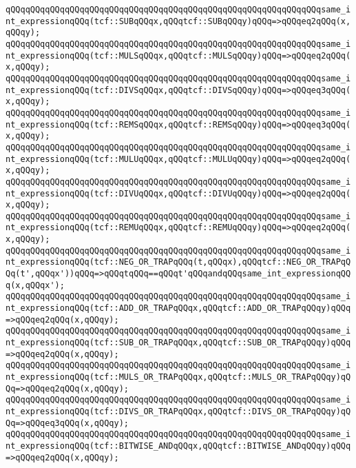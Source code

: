 \verb|qQQqqQQqqQQqqQQqqQQqqQQqqQQqqQQqqQQqqQQqqQQqqQQqqQQqqQQqqQQqqQQqsame_int_expressionqQQq(tcf::SUBqQQqx,qQQqtcf::SUBqQQqy)qQQq=>qQQqeq2qQQq(x,qQQqy);|\newline
\verb|qQQqqQQqqQQqqQQqqQQqqQQqqQQqqQQqqQQqqQQqqQQqqQQqqQQqqQQqqQQqqQQqsame_int_expressionqQQq(tcf::MULSqQQqx,qQQqtcf::MULSqQQqy)qQQq=>qQQqeq2qQQq(x,qQQqy);|\newline
\verb|qQQqqQQqqQQqqQQqqQQqqQQqqQQqqQQqqQQqqQQqqQQqqQQqqQQqqQQqqQQqqQQqsame_int_expressionqQQq(tcf::DIVSqQQqx,qQQqtcf::DIVSqQQqy)qQQq=>qQQqeq3qQQq(x,qQQqy);|\newline
\verb|qQQqqQQqqQQqqQQqqQQqqQQqqQQqqQQqqQQqqQQqqQQqqQQqqQQqqQQqqQQqqQQqsame_int_expressionqQQq(tcf::REMSqQQqx,qQQqtcf::REMSqQQqy)qQQq=>qQQqeq3qQQq(x,qQQqy);|\newline
\verb|qQQqqQQqqQQqqQQqqQQqqQQqqQQqqQQqqQQqqQQqqQQqqQQqqQQqqQQqqQQqqQQqsame_int_expressionqQQq(tcf::MULUqQQqx,qQQqtcf::MULUqQQqy)qQQq=>qQQqeq2qQQq(x,qQQqy);|\newline
\verb|qQQqqQQqqQQqqQQqqQQqqQQqqQQqqQQqqQQqqQQqqQQqqQQqqQQqqQQqqQQqqQQqsame_int_expressionqQQq(tcf::DIVUqQQqx,qQQqtcf::DIVUqQQqy)qQQq=>qQQqeq2qQQq(x,qQQqy);|\newline
\verb|qQQqqQQqqQQqqQQqqQQqqQQqqQQqqQQqqQQqqQQqqQQqqQQqqQQqqQQqqQQqqQQqsame_int_expressionqQQq(tcf::REMUqQQqx,qQQqtcf::REMUqQQqy)qQQq=>qQQqeq2qQQq(x,qQQqy);|\newline
\verb|qQQqqQQqqQQqqQQqqQQqqQQqqQQqqQQqqQQqqQQqqQQqqQQqqQQqqQQqqQQqqQQqsame_int_expressionqQQq(tcf::NEG_OR_TRAPqQQq(t,qQQqx),qQQqtcf::NEG_OR_TRAPqQQq(t',qQQqx'))qQQq=>qQQqtqQQq==qQQqt'qQQqandqQQqsame_int_expressionqQQq(x,qQQqx');|\newline
\verb|qQQqqQQqqQQqqQQqqQQqqQQqqQQqqQQqqQQqqQQqqQQqqQQqqQQqqQQqqQQqqQQqsame_int_expressionqQQq(tcf::ADD_OR_TRAPqQQqx,qQQqtcf::ADD_OR_TRAPqQQqy)qQQq=>qQQqeq2qQQq(x,qQQqy);|\newline
\verb|qQQqqQQqqQQqqQQqqQQqqQQqqQQqqQQqqQQqqQQqqQQqqQQqqQQqqQQqqQQqqQQqsame_int_expressionqQQq(tcf::SUB_OR_TRAPqQQqx,qQQqtcf::SUB_OR_TRAPqQQqy)qQQq=>qQQqeq2qQQq(x,qQQqy);|\newline
\verb|qQQqqQQqqQQqqQQqqQQqqQQqqQQqqQQqqQQqqQQqqQQqqQQqqQQqqQQqqQQqqQQqsame_int_expressionqQQq(tcf::MULS_OR_TRAPqQQqx,qQQqtcf::MULS_OR_TRAPqQQqy)qQQq=>qQQqeq2qQQq(x,qQQqy);|\newline
\verb|qQQqqQQqqQQqqQQqqQQqqQQqqQQqqQQqqQQqqQQqqQQqqQQqqQQqqQQqqQQqqQQqsame_int_expressionqQQq(tcf::DIVS_OR_TRAPqQQqx,qQQqtcf::DIVS_OR_TRAPqQQqy)qQQq=>qQQqeq3qQQq(x,qQQqy);|\newline
\verb|qQQqqQQqqQQqqQQqqQQqqQQqqQQqqQQqqQQqqQQqqQQqqQQqqQQqqQQqqQQqqQQqsame_int_expressionqQQq(tcf::BITWISE_ANDqQQqx,qQQqtcf::BITWISE_ANDqQQqy)qQQq=>qQQqeq2qQQq(x,qQQqy);|\newline
